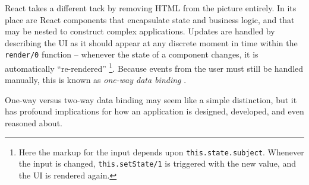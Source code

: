\documentclass[12pt,letterpaper]{article}
\begin{document}
React takes a different tack by removing HTML from the picture entirely. In its place are React components that encapsulate state and business logic, and that may be nested to construct complex applications. Updates are handled by describing the UI as it should appear at any discrete moment in time within the \texttt{render/0} function -- whenever the state of a component changes, it is automatically ``re-rendered'' \footnote{Here the markup for the input depends upon \texttt{this.state.subject}. Whenever the input is changed, \texttt{this.setState/1} is triggered with the new value, and the UI is rendered again.}. Because events from the user must still be handled manually, this is known as \emph{one-way data binding} \cite{Hunt:2014}.




One-way versus two-way data binding may seem like a simple distinction, but it has profound implications for how an application is designed, developed, and even reasoned about.






















\end{document}
